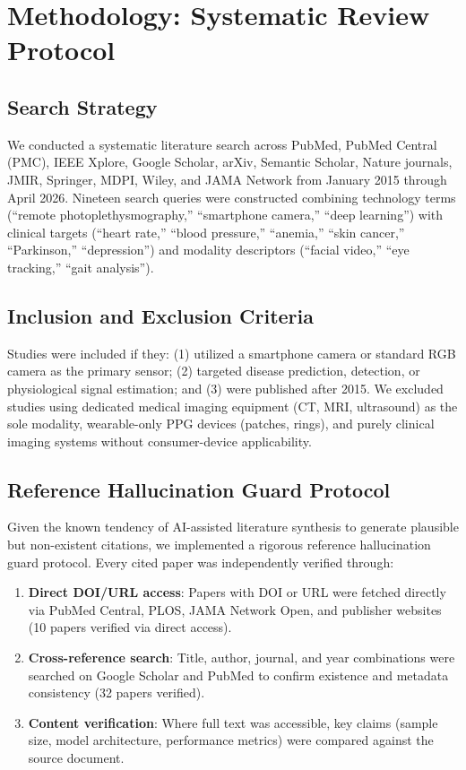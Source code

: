 \documentclass[conference]{IEEEtran}
\begin{document}
\section{Methodology: Systematic Review Protocol}

\subsection{Search Strategy}

We conducted a systematic literature search across PubMed, PubMed Central (PMC), IEEE Xplore, Google Scholar, arXiv, Semantic Scholar, Nature journals, JMIR, Springer, MDPI, Wiley, and JAMA Network from January 2015 through April 2026. Nineteen search queries were constructed combining technology terms (``remote photoplethysmography,'' ``smartphone camera,'' ``deep learning'') with clinical targets (``heart rate,'' ``blood pressure,'' ``anemia,'' ``skin cancer,'' ``Parkinson,'' ``depression'') and modality descriptors (``facial video,'' ``eye tracking,'' ``gait analysis'').

\subsection{Inclusion and Exclusion Criteria}

Studies were included if they: (1) utilized a smartphone camera or standard RGB camera as the primary sensor; (2) targeted disease prediction, detection, or physiological signal estimation; and (3) were published after 2015. We excluded studies using dedicated medical imaging equipment (CT, MRI, ultrasound) as the sole modality, wearable-only PPG devices (patches, rings), and purely clinical imaging systems without consumer-device applicability.

\subsection{Reference Hallucination Guard Protocol}

Given the known tendency of AI-assisted literature synthesis to generate plausible but non-existent citations, we implemented a rigorous reference hallucination guard protocol. Every cited paper was independently verified through:

\begin{enumerate}
\item \textbf{Direct DOI/URL access}: Papers with DOI or URL were fetched directly via PubMed Central, PLOS, JAMA Network Open, and publisher websites (10 papers verified via direct access).
\item \textbf{Cross-reference search}: Title, author, journal, and year combinations were searched on Google Scholar and PubMed to confirm existence and metadata consistency (32 papers verified).
\item \textbf{Content verification}: Where full text was accessible, key claims (sample size, model architecture, performance metrics) were compared against the source document.
\end{enumerate}
\end{document}
